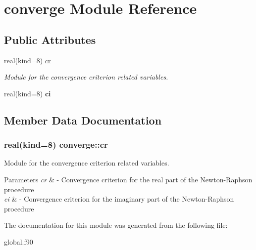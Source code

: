 \hypertarget{classconverge}{\section{converge Module Reference}
\label{classconverge}
}
\subsection*{Public Attributes}
\begin{DoxyCompactItemize}
\item 
real(kind=8) \hyperlink{classconverge_ae362312b85face11eefb03488afbfb7b}{cr}
\begin{DoxyCompactList}\small\item\em Module for the convergence criterion related variables. \end{DoxyCompactList}\item 
\hypertarget{classconverge_a8c19224762ce59d5bcdccb0e25ca55f8}{real(kind=8) {\bfseries ci}}\label{classconverge_a8c19224762ce59d5bcdccb0e25ca55f8}

\end{DoxyCompactItemize}


\subsection{Member Data Documentation}
\hypertarget{classconverge_ae362312b85face11eefb03488afbfb7b}{
\subsubsection[{cr}]{\setlength{\rightskip}{0pt plus 5cm}real(kind=8) converge\-::cr}}\label{classconverge_ae362312b85face11eefb03488afbfb7b}


Module for the convergence criterion related variables. 


\begin{DoxyParams}{Parameters}
{\em cr} & -\/ Convergence criterion for the real part of the Newton-\/\-Raphson procedure \\
\hline
{\em ci} & -\/ Convergence criterion for the imaginary part of the Newton-\/\-Raphson procedure \\
\hline
\end{DoxyParams}


The documentation for this module was generated from the following file\-:\begin{DoxyCompactItemize}
\item 
global.\-f90\end{DoxyCompactItemize}
